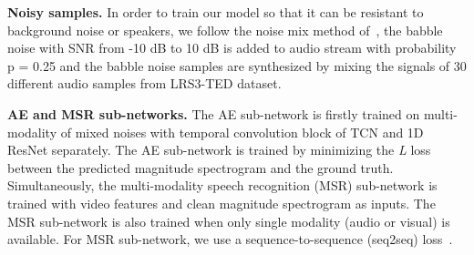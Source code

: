 \documentclass[10pt,twocolumn,letterpaper]{article}
\begin{document}
{\bf Noisy samples.} In order to train our model so that it can be resistant to background noise or speakers, we follow the noise mix method of~\cite{Triantafyllos-avsr2018}, the babble noise with SNR from -10 dB to 10 dB is added to audio stream with probability p = 0.25 and the babble noise samples are synthesized by mixing the signals of 30 different audio samples from LRS3-TED dataset. 

{\bf AE and MSR sub-networks.} The AE sub-network is firstly trained on multi-modality of mixed noises with temporal convolution block of TCN and 1D ResNet separately. The AE sub-network is trained by minimizing the \emph{L} loss between the predicted magnitude spectrogram and the ground truth. Simultaneously, the multi-modality speech recognition (MSR) sub-network is trained with video features and clean magnitude spectrogram as inputs. The MSR sub-network is also trained when only single modality (audio or visual) is available. For MSR sub-network, we use a sequence-to-sequence (seq2seq) loss~\cite{cho2014learning,sutskever2014sequence}.
\end{document}
